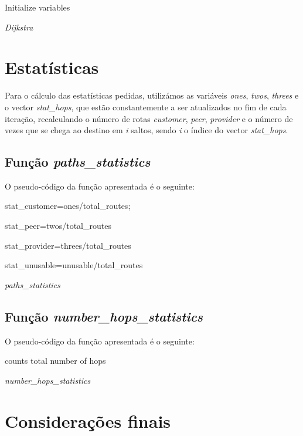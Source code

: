 \documentclass[a4paper]{article}
\begin{document}
\begin{algorithm}[H]
 Initialize variables\;
 
 
 \caption{\textit{Dijkstra}}
\end{algorithm}

\section{Estatísticas}
Para o cálculo das estatísticas pedidas, utilizámos as variáveis \textit{ones}, \textit{twos}, \textit{threes} e o vector \textit{stat\_hops}, que estão constantemente a ser atualizados no fim de cada iteração, recalculando o número de rotas \textit{customer}, \textit{peer}, \textit{provider} e o número de vezes que se chega ao destino em \textit{i} saltos, sendo \textit{i} o índice do vector \textit{stat\_hops}.
\subsection{Função \textit{paths\_statistics}}
O pseudo-código da função apresentada é o seguinte:

\begin{algorithm}[H]
  stat\_customer=ones/total\_routes;
  
  stat\_peer=twos/total\_routes\;
  
  stat\_provider=threes/total\_routes\;
  
  stat\_unusable=unusable/total\_routes\;
 \caption{\textit{paths\_statistics}}
\end{algorithm}
\subsection{Função \textit{number\_hops\_statistics}}
O pseudo-código da função apresentada é o seguinte:

\begin{algorithm}[H]
 counts total number of hops\;
 
 
 \caption{\textit{number\_hops\_statistics}}
\end{algorithm}
\section{Considerações finais}
\end{document}
